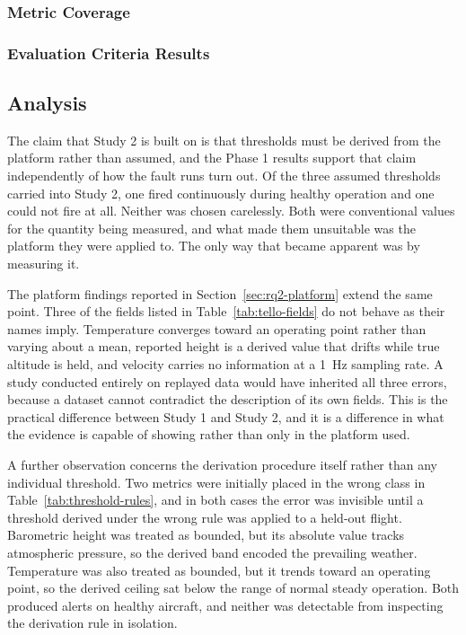\subsubsection{Metric Coverage}\label{sec:rq2-coverage}


\subsubsection{Evaluation Criteria Results}\label{sec:rq2-criteria}


\subsection{Analysis}\label{sec:rq2-analysis}

The claim that Study 2 is built on is that thresholds must be derived from the
platform rather than assumed, and the Phase 1 results support that claim
independently of how the fault runs turn out. Of the three assumed thresholds
carried into Study 2, one fired continuously during healthy operation and one
could not fire at all. Neither was chosen carelessly. Both were conventional
values for the quantity being measured, and what made them unsuitable was the
platform they were applied to. The only way that became apparent was by
measuring it.

The platform findings reported in Section~\ref{sec:rq2-platform} extend the same
point. Three of the fields listed in Table~\ref{tab:tello-fields} do not behave
as their names imply. Temperature converges toward an operating point rather
than varying about a mean, reported height is a derived value that drifts while
true altitude is held, and velocity carries no information at a \SI{1}{\hertz}
sampling rate. A study conducted entirely on replayed data would have inherited
all three errors, because a dataset cannot contradict the description of its own
fields. This is the practical difference between Study 1 and Study 2, and it is
a difference in what the evidence is capable of showing rather than only in the
platform used.

A further observation concerns the derivation procedure itself rather than any
individual threshold. Two metrics were initially placed in the wrong class in
Table~\ref{tab:threshold-rules}, and in both cases the error was invisible until
a threshold derived under the wrong rule was applied to a held-out flight.
Barometric height was treated as bounded, but its absolute value tracks
atmospheric pressure, so the derived band encoded the prevailing weather.
Temperature was also treated as bounded, but it trends toward an operating point,
so the derived ceiling sat below the range of normal steady operation. Both
produced alerts on healthy aircraft, and neither was detectable from inspecting
the derivation rule in isolation.


